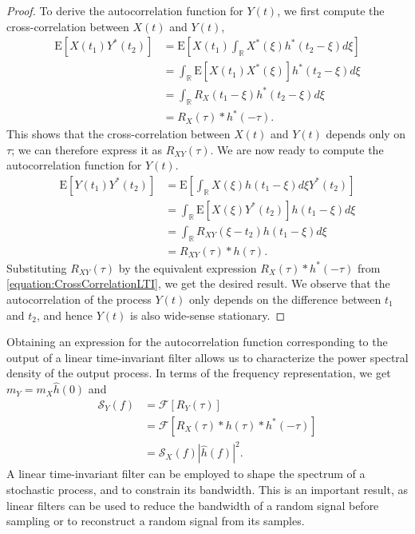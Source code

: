 \begin{proof}
To derive the autocorrelation function for $Y(t)$, we first compute the cross-correlation between $X(t)$ and $Y(t)$,
\begin{equation} \label{equation:CrossCorrelationLTI}
\begin{split}
\mathrm{E} [X(t_1) Y^*(t_2) ]
&= \mathrm{E} \left[ X(t_1) \int_{\mathbb{R}} X^*(\xi) h^*(t_2 - \xi) d\xi \right] \\
&= \int_{\mathbb{R}} \mathrm{E} \left[ X(t_1) X^*(\xi) \right] h^*(t_2 - \xi) d\xi \\
&= \int_{\mathbb{R}} R_X(t_1 - \xi) h^*(t_2 - \xi) d\xi \\
&= R_X(\tau) \ast h^*(-\tau) .
\end{split}
\end{equation}
This shows that the cross-correlation between $X(t)$ and $Y(t)$ depends only on $\tau$; we can therefore express it as $R_{XY}(\tau)$.
We are now ready to compute the autocorrelation function for $Y(t)$.
\begin{equation} \label{equation:AutoCorrelationLTI}
\begin{split}
\mathrm{E} [Y(t_1) Y^*(t_2) ]
&= \mathrm{E} \left[ \int_{\mathbb{R}} X(\xi) h(t_1 - \xi) d\xi Y^*(t_2) \right] \\
&= \int_{\mathbb{R}} \mathrm{E} \left[ X(\xi) Y^*(t_2) \right] h(t_1 - \xi) d\xi \\
&= \int_{\mathbb{R}} R_{XY}(\xi - t_2) h(t_1 - \xi) d\xi \\
&= R_{XY}(\tau) \ast h(\tau) .
\end{split}
\end{equation}
Substituting $R_{XY} (\tau)$ by the equivalent expression $R_X(\tau) \ast h^*(-\tau)$ from \eqref{equation:CrossCorrelationLTI}, we get the desired result.
We observe that the autocorrelation of the process $Y(t)$ only depends on the difference between $t_1$ and $t_2$, and hence $Y(t)$ is also wide-sense stationary.
\end{proof}

Obtaining an expression for the autocorrelation function corresponding to the output of a linear time-invariant filter allows us to characterize the power spectral density of the output process.
In terms of the frequency representation, we get $m_Y = m_X \hat{h}(0)$ and
\begin{equation*}
\begin{split}
\mathcal{S}_Y (f) &= \mathcal{F} [ R_Y (\tau) ] \\
&= \mathcal{F} \left[ R_X (\tau) \ast h(\tau) \ast h^*(-\tau) \right] \\
&= \mathcal{S}_X(f) | \hat{h}(f) |^2 .
\end{split}
\end{equation*}
A linear time-invariant filter can be employed to shape the spectrum of a stochastic process, and to constrain its bandwidth.
This is an important result, as linear filters can be used to reduce the bandwidth of a random signal before sampling or to reconstruct a random signal from its samples.

